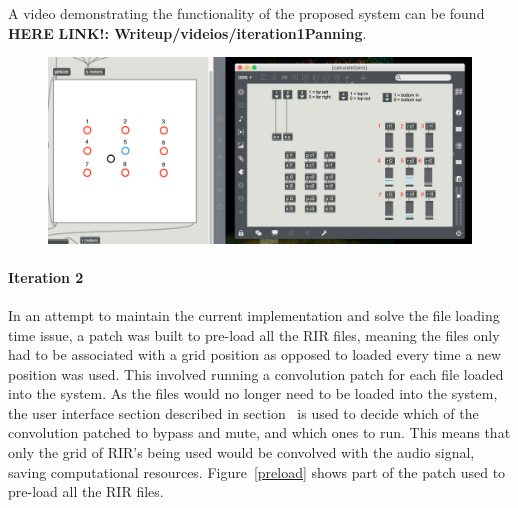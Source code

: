 \documentclass[../../main.tex]{subfiles}
\begin{document}
		 	A video demonstrating the functionality of the proposed system can be found \textbf{HERE} \textbf{LINK!: Writeup/videios/iteration1Panning}.

			\begin{figure}[H]
				\centerline{\includegraphics[scale = 0.45]{Sections/Implementation/Max/images/Max/iteration1/panning_edit2.png}}
				\caption{}
				\label{iteration1Panning}
			\end{figure}



		 \paragraph{Iteration 2}

		 	In an attempt to maintain the current implementation and solve the file loading time issue, a patch was built to pre-load all the \ac{RIR} files, meaning the files only had to be associated with a grid position as opposed to loaded every time a new position was used. This involved running a convolution patch for each file loaded into the system. As the files would no longer need to be loaded into the system, the user interface section described in section~ is used to decide which of the convolution patched to bypass and mute, and which ones to run. This means that only the grid of \ac{RIR}'s being used would be convolved with the audio signal, saving computational resources. Figure~\ref{preload} shows part of the patch used to pre-load all the \ac{RIR} files.
\end{document}
